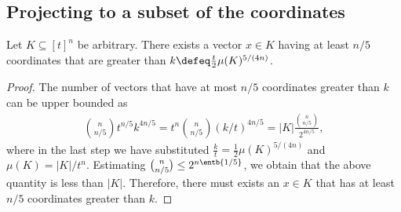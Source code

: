 \subsection{Projecting to a subset of the coordinates}
\label{sec:isoperimetry:proj}
\begin{lemma}
\label{lem:find-prod}
Let $K\subseteq [t]^n$ be arbitrary. 
There exists a vector $x\in K$ having at least $n/5$ 
coordinates that are greater than 
$k\defeq\frac{t}{2}\mu(K)^{5/(4n)}$.
\end{lemma}
\begin{proof}
The number of vectors that have at most $n/5$ coordinates 
greater than $k$ can be upper bounded as 
\begin{align*}
{n\choose n/5} t^{n/5} k^{4n/5} 
= t^n {n\choose n/5} (k/t)^{4n/5} 
= |K|\frac{{n \choose n/5}}{2^{4n /5}},
\end{align*}
where in the last step we have substituted
$\frac{k}{t}=\frac{1}{2}\mu(K)^{5/(4n)}$ and 
$\mu(K) = |K| / t^n$.
Estimating ${n\choose n/5}\le 2^{n\entb{1/5}}$, 
we obtain that the above quantity is less than $|K|$.
Therefore, there must exists an $x\in K$ that has at least 
$n/5$ coordinates greater than $k$.
\end{proof}

